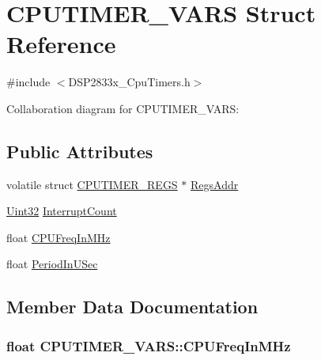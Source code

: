 \hypertarget{struct_c_p_u_t_i_m_e_r___v_a_r_s}{}\section{C\+P\+U\+T\+I\+M\+E\+R\+\_\+\+V\+A\+R\+S Struct Reference}
\label{struct_c_p_u_t_i_m_e_r___v_a_r_s}


{\ttfamily \#include $<$D\+S\+P2833x\+\_\+\+Cpu\+Timers.\+h$>$}



Collaboration diagram for C\+P\+U\+T\+I\+M\+E\+R\+\_\+\+V\+A\+R\+S\+:
\subsection*{Public Attributes}
\begin{DoxyCompactItemize}
\item 
volatile struct \hyperlink{struct_c_p_u_t_i_m_e_r___r_e_g_s}{C\+P\+U\+T\+I\+M\+E\+R\+\_\+\+R\+E\+G\+S} $\ast$ \hyperlink{struct_c_p_u_t_i_m_e_r___v_a_r_s_a93c71efa618d7cf9ae8f95db0c5acd6c}{Regs\+Addr}
\item 
\hyperlink{_d_s_p2833x___device_8h_aba99025e657f892beb7ff31cecf64653}{Uint32} \hyperlink{struct_c_p_u_t_i_m_e_r___v_a_r_s_a83ad083116197c6db8709e4a83c4965e}{Interrupt\+Count}
\item 
float \hyperlink{struct_c_p_u_t_i_m_e_r___v_a_r_s_a7ab130566272154c1532f0fe365db1a8}{C\+P\+U\+Freq\+In\+M\+Hz}
\item 
float \hyperlink{struct_c_p_u_t_i_m_e_r___v_a_r_s_abb588e9091af6b4e731f7425a0d641c6}{Period\+In\+U\+Sec}
\end{DoxyCompactItemize}


\subsection{Member Data Documentation}
\hypertarget{struct_c_p_u_t_i_m_e_r___v_a_r_s_a7ab130566272154c1532f0fe365db1a8}{}
\subsubsection[{C\+P\+U\+Freq\+In\+M\+Hz}]{\setlength{\rightskip}{0pt plus 5cm}float C\+P\+U\+T\+I\+M\+E\+R\+\_\+\+V\+A\+R\+S\+::\+C\+P\+U\+Freq\+In\+M\+Hz}\label{struct_c_p_u_t_i_m_e_r___v_a_r_s_a7ab130566272154c1532f0fe365db1a8}
\hypertarget{struct_c_p_u_t_i_m_e_r___v_a_r_s_a83ad083116197c6db8709e4a83c4965e}{}

